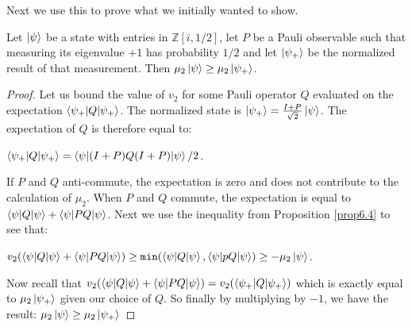\documentclass[12pt]{dalthesis}
\begin{document}
Next we use this to prove what we initially wanted to show.
\begin{proposition}
\label{dyadic is monotone}
Let $\ket{\psi}$ be a state with entries in $\mathbb{Z}[i, 1/2]$, let $P$ be a Pauli observable such that measuring its eigenvalue $+1$ has probability $1/2$ and let $\ket{\psi_+}$ be the normalized result of that measurement. Then $\mu_2\ket{\psi} \geq \mu_2\ket{\psi_+}$. 
\end{proposition}
\begin{proof}
Let us bound the value of $v_2$ for some Pauli operator $Q$ evaluated on the expectation $\braket{\psi_+ | Q |\psi_+}$. The normalized state is $\ket{\psi_+} = \frac{I + P}{\sqrt{2}}\ket{\psi}$. The expectation of $Q$ is therefore equal to:
\begin{center}
$\braket{\psi_+ | Q |\psi_+} = \braket{\psi | (I + P)Q(I + P) | \psi}/2$.
\end{center}
If $P$ and $Q$ anti-commute, the expectation is zero and does not contribute to the calculation of $\mu_2$. When $P$ and $Q$ commute, the expectation is equal to $\braket{\psi | Q | \psi} + \braket{\psi |PQ |\psi}$. Next we use the inequality from Proposition \ref{prop6.4} to see that:
\begin{center}
$v_2(\braket{\psi |Q| \psi} + \braket{\psi |PQ| \psi}) \geq \texttt{min}(\braket{\psi |Q|\psi}, \braket{\psi |pQ|\psi}) \geq -\mu_2\ket{\psi}$.
\end{center}
Now recall that $v_2(\braket{\psi |Q| \psi} + \braket{\psi |PQ| \psi}) = v_2(\braket{\psi_+ |Q| \psi_+})$ which is exactly equal to $\mu_2\ket{\psi_+}$ given our choice of $Q$. So finally by multiplying by $-1$, we have the result: $\mu_2\ket{\psi} \geq \mu_2\ket{\psi_+}$
\end{proof}
\end{document}
